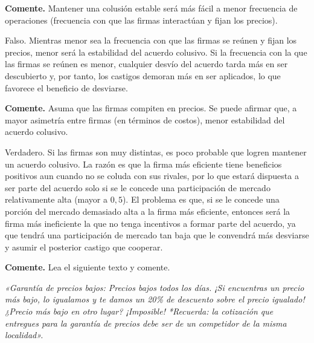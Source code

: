 \question \textbf{Comente.} Mantener una colusión estable será más fácil a menor frecuencia de operaciones (frecuencia con que las firmas interactúan y fijan los precios).
\begin{solution}
Falso. Mientras menor sea la frecuencia con que las firmas se reúnen y fijan los precios, menor será la estabilidad del acuerdo colusivo. Si la frecuencia con la que las firmas se reúnen es menor, cualquier desvío del acuerdo tarda más en ser descubierto y, por tanto, los castigos demoran más en ser aplicados, lo que favorece el beneficio de desviarse.

\end{solution}

\question \textbf{Comente.} Asuma que las firmas compiten en precios. Se puede afirmar que, a mayor asimetría entre firmas (en términos de costos), menor estabilidad del acuerdo colusivo.
\begin{solution}
Verdadero. Si las firmas son muy distintas, es poco probable que logren mantener un acuerdo colusivo. La razón es que la firma más eficiente tiene beneficios positivos aun cuando no se coluda con sus rivales, por lo que estará dispuesta a ser parte del acuerdo solo si se le concede una participación de mercado relativamente alta (mayor a $0{,}5$). El problema es que, si se le concede una porción del mercado demasiado alta a la firma más eficiente, entonces será la firma más ineficiente la que no tenga incentivos a formar parte del acuerdo, ya que tendrá una participación de mercado tan baja que le convendrá más desviarse y asumir el posterior castigo que cooperar.

\end{solution}

\question \textbf{Comente.} Lea el siguiente texto y comente.

\emph{«Garantía de precios bajos: Precios bajos todos los días. ¡Si encuentras un precio más bajo, lo igualamos y te damos un 20\% de descuento sobre el precio igualado! ¿Precio más bajo en otro lugar? ¡Imposible! *Recuerda: la cotización que entregues para la garantía de precios debe ser de un competidor de la misma localidad».}

